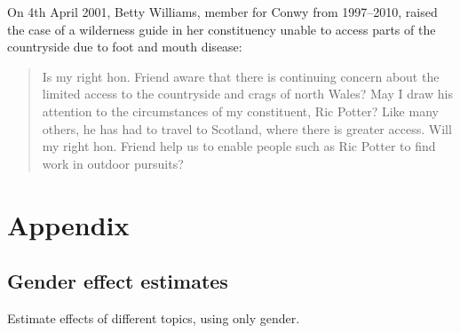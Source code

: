 \documentclass[]{article}
\theoremstyle{definition}
\theoremstyle{definition}
\theoremstyle{definition}
\theoremstyle{remark}
\begin{document}
On 4th April 2001, Betty Williams, member for Conwy from 1997--2010,
raised the case of a wilderness guide in her constituency unable to
access parts of the countryside due to foot and mouth disease:

\begin{quote}
Is my right hon. Friend aware that there is continuing concern about the
limited access to the countryside and crags of north Wales? May I draw
his attention to the circumstances of my constituent, Ric Potter? Like
many others, he has had to travel to Scotland, where there is greater
access. Will my right hon. Friend help us to enable people such as Ric
Potter to find work in outdoor pursuits?
\end{quote}

\clearpage

\hypertarget{appendix}{%
\section{Appendix}\label{appendix}}

\hypertarget{gender-effect-estimates}{%
\subsection{Gender effect estimates}\label{gender-effect-estimates}}

Estimate effects of different topics, using only gender.
\end{document}
